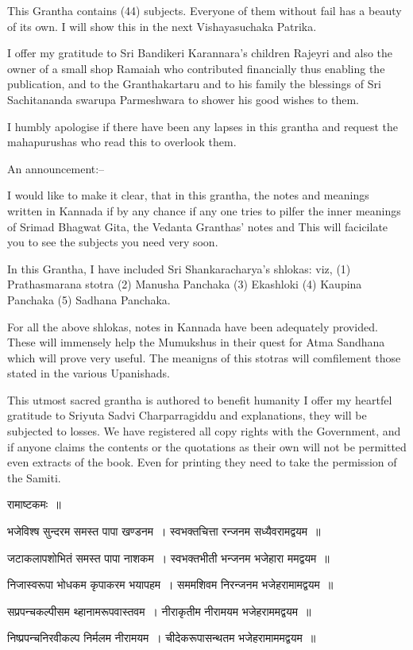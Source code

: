 This Grantha contains (44) subjects. Everyone of them without fail has a beauty of its own. I will show this in the next Vishayasuchaka Patrika.

I offer my gratitude to Sri Bandikeri Karannara's children Rajeyri and also the owner of a small shop Ramaiah who contributed financially thus enabling the publication, and to the Granthakartaru and to his family the blessings of Sri Sachitananda swarupa Parmeshwara to shower his good wishes to them.

I humbly apologise if there have been any lapses in this grantha and request the mahapurushas who read this to overlook them.

An announcement:–

I would like to make it clear, that in this grantha, the notes and meanings written in Kannada if by any chance if any one tries to pilfer the inner meanings of Srimad Bhagwat Gita, the Vedanta Granthas' notes and This will facicilate you to see the subjects you need very soon.

In this Grantha, I have included Sri Shankaracharya's shlokas: viz, (1) Prathasmarana stotra (2) Manusha Panchaka (3) Ekashloki (4) Kaupina Panchaka (5) Sadhana Panchaka.

For all the above shlokas, notes in Kannada have been adequately provided. These will immensely help the Mumukshus in their quest for Atma Sandhana which will prove very useful. The meanigns of this stotras will comfilement those stated in the various Upanishads.

This utmost sacred grantha is authored to benefit humanity I offer my heartfel gratitude to Sriyuta Sadvi Charparragiddu and explanations, they will be subjected to losses. We have registered all copy rights with the Government, and if anyone claims the contents or the quotations as their own will not be permitted even extracts of the book. Even for printing they need to take the permission of the Samiti.


रामाष्टकमः~॥

 भजेविश्ष सुन्दरम समस्त पापा खण्डनम~।
 स्वभक्तचित्ता रन्जनम सध्यैवरामद्वयम~॥

 जटाकलापशोभितं समस्त पापा नाशकम~।
 स्वभक्तभीती भन्जनम भजेहारा ममद्वयम~॥

 निजास्वरूपा भोधकम कृपाकरम भयापहम~।
 सममशिवम निरन्जनम भजेहरामामद्वयम~॥

 सप्रपन्चकल्पीसम थ्हानामरूपवास्तवम~।
 नीराकृतीम नीरामयम भजेहराममद्वयम~॥

 निष्प्रपन्चनिरवीकल्प निर्मलम नीरामयम~।
 चीदेकरूपासन्थतम भजेहरामाममद्वयम~॥

